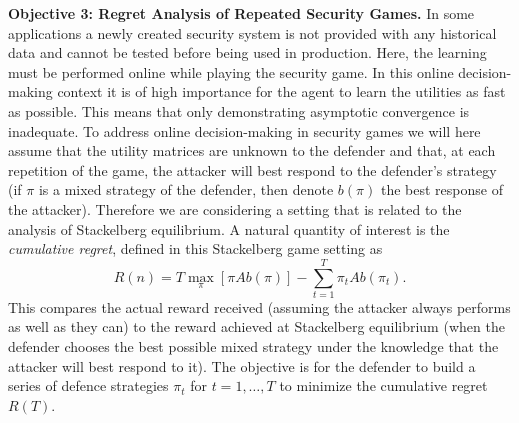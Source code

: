 \textbf{Objective 3: Regret Analysis of Repeated Security Games.}
In some applications a newly created security system is not provided with any historical data and cannot be tested before being used in production. Here, the learning must be performed online while playing the security game. In this online decision-making context it is of high importance for the agent to learn the utilities as fast as possible. This means that only demonstrating asymptotic convergence\cite{LeslieCollins06,ChapmanEtAl2013} is inadequate. To address online decision-making in security games we will here assume that the utility matrices are unknown to the defender and that, at each repetition of the game, the attacker will best respond to the defender's strategy (if $\pi$ is a mixed strategy of the defender, then denote $b(\pi)$ the best response of the attacker). Therefore we are considering a setting that is related to the analysis of Stackelberg equilibrium. A natural quantity of interest is the \textit{cumulative regret}, defined in this Stackelberg game setting as
\begin{equation*}
R(n)=T\max_{\pi} \left[\pi A b(\pi)\right]-\sum_{t=1}^T \pi_t A b(\pi_t).
\end{equation*}
This compares the actual reward received (assuming the attacker always performs as well as they can) to the reward achieved at Stackelberg equilibrium (when the defender chooses the best possible mixed strategy under the knowledge that the attacker will best respond to it).  The objective is for the defender to build a series of defence strategies $\pi_t$ for $t=1,\ldots, T$ to minimize the cumulative regret $R(T)$.
% 
%
 
